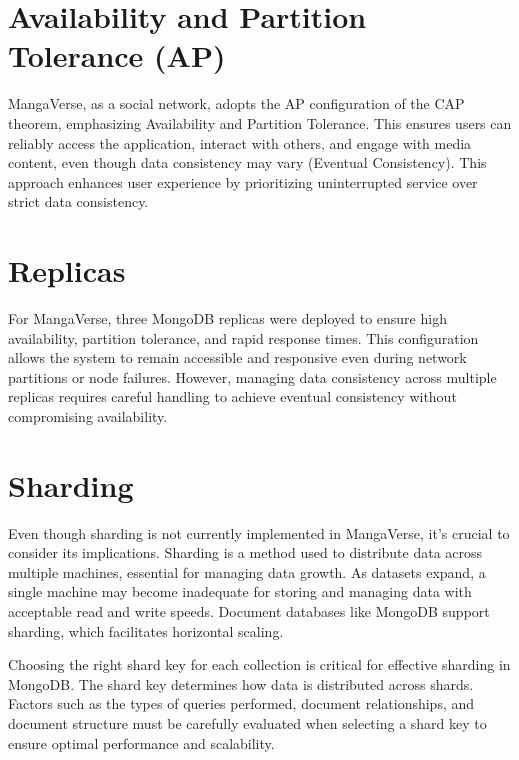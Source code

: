 \vspace{\baselineskip}

\section{Availability and Partition Tolerance (AP)}

MangaVerse, as a social network, adopts the AP configuration of the CAP theorem, emphasizing Availability
and Partition Tolerance. This ensures users can reliably access the application, interact with others,
and engage with media content, even though data consistency may vary (Eventual Consistency).
This approach enhances user experience by prioritizing uninterrupted service over strict data consistency.

\section{Replicas}

For MangaVerse, three MongoDB replicas were deployed to ensure high availability, partition tolerance,
and rapid response times. This configuration allows the system to remain accessible and responsive even
during network partitions or node failures. However, managing data consistency across multiple replicas
requires careful handling to achieve eventual consistency without compromising availability.

\section{Sharding}

Even though sharding is not currently implemented in MangaVerse, it's crucial to consider its implications.
Sharding is a method used to distribute data across multiple machines, essential for managing data growth.
As datasets expand, a single machine may become inadequate for storing and managing data with acceptable
read and write speeds. Document databases like MongoDB support sharding, which facilitates horizontal scaling.

\vspace{\baselineskip}

Choosing the right shard key for each collection is critical for effective sharding in MongoDB\@.
The shard key determines how data is distributed across shards. Factors such as the types of queries performed,
document relationships, and document structure must be carefully evaluated when selecting a shard key to ensure
optimal performance and scalability.

